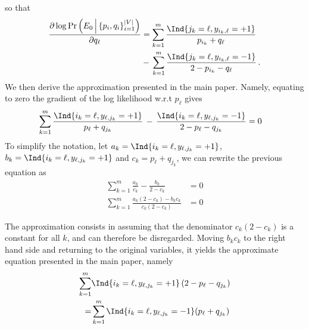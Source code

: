 %
so that
%
\begin{align*}
\frac{\partial \log \Pr\left(E_0\,\Big|\, \{p_i, q_i\}_{i=1}^{|V|}\right)}{\partial q_{\ell}}
&= 
\sum_{k=1}^m 
\frac{\Ind{j_k = \ell,y_{i_k,\ell}=+1}}{p_{i_k}+q_{\ell}}\,\\ 
&- \,
\sum_{k=1}^m 
\frac{\Ind{j_k = \ell,y_{i_k,\ell}=-1}}{2-p_{i_k}-q_{\ell}}\,.
\end{align*}
%
We then derive the approximation presented in the main paper. Namely, equating to zero the
gradient of the log likelihood w.r.t $p_\ell$ gives
\begin{align*}
\sum_{k=1}^m 
\frac{\Ind{i_k = \ell,y_{\ell,j_k}=+1}}{p_{\ell}+q_{j_k}}\,
 - \,
\frac{\Ind{i_k = \ell,y_{\ell,j_k}=-1}}{2-p_{\ell}-q_{j_k}} &= 0
\end{align*}
To simplify the notation, let $a_k = \Ind{i_k = \ell,y_{\ell,j_k}=+1}$, $b_k=\Ind{i_k =
\ell,y_{\ell,j_k}=+1}$ and $c_k = p_{\ell} + q_{j_k}$, we can rewrite the previous equation as 
\begin{align*}
\sum_{k=1}^m \frac{a_k}{c_k} - \frac{b_k}{2-c_k} &= 0 \\
\sum_{k=1}^m  \frac{a_k(2-c_k) - b_k c_k }{ c_k(2-c_k) } &=0
\end{align*}

The approximation consists in assuming that the denominator $c_k(2-c_k)$ is a
constant for all $k$, and can therefore be disregarded.
Moving $b_kc_k$ to the right hand side and returning to the original variables,
it yields the approximate equation presented in the main paper, namely
\begin{align*}
\sum_{k=1}^m &\Ind{i_k = \ell,y_{\ell,j_k}=+1} \left(2-p_{\ell}-q_{j_k}\right)\\
=
&\sum_{k=1}^m \Ind{i_k = \ell,y_{\ell,j_k}=-1}
(p_{\ell}+q_{j_k})%
\end{align*}

\iffalse
By applying a similar process to the gradient w.r.t. $q_\ell$, we obtain the
following approximate equation
\begin{align*}
\sum_{k=1}^m &\Ind{j_k = \ell,y_{i_k,\ell}=+1} \left(2-p_{i_k}-q_{\ell}\right)\\
=
&\sum_{k=1}^m  \Ind{j_k = \ell,y_{i_k,\ell}=-1}
\left(p_{i_k}+q_{\ell}\right)
\end{align*}
\fi

